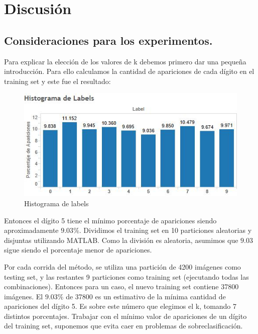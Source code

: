 \documentclass{article}
\begin{document}
\pagebreak


\section*{Discusión}{}



\subsection*{Consideraciones para los experimentos.}

Para explicar la elección de los valores de k debemos primero dar una pequeña introducción.  Para ello calculamos la cantidad de apariciones de cada dígito en el training set y este fue el resultado:

\begin{figure}[h]
\centering
\includegraphics[scale=0.80]{histo.jpg}
\caption{Histograma de labels}
\end{figure}

Entonces el dígito 5 tiene el mínimo porcentaje de apariciones siendo aproximadamente $9.03\%$.  Dividimos el training set en 10 particiones aleatorias y disjuntas utilizando MATLAB. Como la división es aleatoria, asumimos que $9.03$ sigue siendo el porcentaje menor de apariciones. 

Por cada corrida del método, se utiliza una partición de 4200 imágenes como testing set, y las restantes 9 particiones como training set (ejecutando todas las combinaciones).  Entonces para un caso, el nuevo training set contiene 37800 imágenes. El $9.03\%$ de 37800 es un estimativo de la mínima cantidad de apariciones del dígito 5. Es sobre este número que elegimos el k, tomando 7 distintos porcentajes. Trabajar con el mínimo valor de apariciones de un dígito del training set, suponemos que evita caer en problemas de sobreclasificación.
\end{document}
